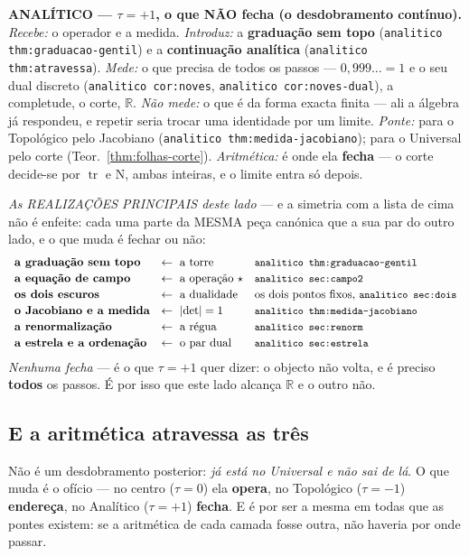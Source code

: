 \documentclass[11pt,a4paper]{article}
\newcommand{\code}[1]{\texttt{\small #1}}
\newcommand{\abs}[1]{\lvert #1\rvert}
\begin{document}
\noindent\textbf{ANALÍTICO --- $\tau=+1$, o que NÃO fecha (o desdobramento contínuo).}
\emph{Recebe:} o operador e a medida. \emph{Introduz:} a \textbf{graduação sem topo}
(\code{analitico thm:graduacao-gentil}) e a \textbf{continuação analítica} (\code{analitico thm:atravessa}).
\emph{Mede:} o que precisa de todos os passos --- $0{,}999\ldots=1$ e o seu dual discreto
(\code{analitico cor:noves}, \code{analitico cor:noves-dual}), a completude, o corte, $\mathbb{R}$.
\emph{Não mede:} o que é da forma exacta finita --- ali a álgebra já respondeu, e repetir
seria trocar uma identidade por um limite. \emph{Ponte:} para o Topológico pelo Jacobiano
(\code{analitico thm:medida-jacobiano}); para o Universal pelo corte
(Teor.~\ref{thm:folhas-corte}). \emph{Aritmética:} é onde ela \textbf{fecha} --- o corte
decide-se por $\operatorname{tr}$ e $\mathrm{N}$, ambas inteiras, e o limite entra só
depois.

\smallskip
\noindent\emph{As REALIZAÇÕES PRINCIPAIS deste lado} --- e a simetria com a lista de cima
não é enfeite: cada uma parte da MESMA peça canónica que a sua par do outro lado, e o que
muda é fechar ou não:
\[
\begin{array}{lll}
\textbf{a graduação sem topo} & \leftarrow\ \text{a torre} &
\text{\code{analitico thm:graduacao-gentil}}\\[2pt]
\textbf{a equação de campo} & \leftarrow\ \text{a operação }\star &
\text{\code{analitico sec:campo2}}\\[2pt]
\textbf{os dois escuros} & \leftarrow\ \text{a dualidade} &
\text{os dois pontos fixos, \code{analitico sec:dois}}\\[2pt]
\textbf{o Jacobiano e a medida} & \leftarrow\ \abs{\det}=1 &
\text{\code{analitico thm:medida-jacobiano}}\\[2pt]
\textbf{a renormalização} & \leftarrow\ \text{a régua} &
\text{\code{analitico sec:renorm}}\\[2pt]
\textbf{a estrela e a ordenação} & \leftarrow\ \text{o par dual} &
\text{\code{analitico sec:estrela}}
\end{array}
\]
\emph{Nenhuma fecha} --- é o que $\tau=+1$ quer dizer: o objecto não volta, e é preciso
\textbf{todos} os passos. É por isso que este lado alcança $\mathbb{R}$ e o outro não.

\subsection*{E a aritmética atravessa as três}

Não é um desdobramento posterior: \emph{já está no Universal e não sai de lá}. O que muda é
o ofício --- no centro ($\tau=0$) ela \textbf{opera}, no Topológico ($\tau=-1$)
\textbf{endereça}, no Analítico ($\tau=+1$) \textbf{fecha}. E é por ser a mesma em todas
que as pontes existem: se a aritmética de cada camada fosse outra, não haveria por onde
passar.
\end{document}
